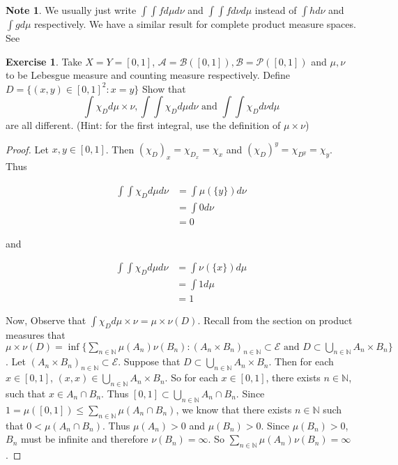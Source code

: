 \documentclass[12pt]{amsart}
\theoremstyle{definition}
\newtheorem{note}[definition]{Note}
\newtheorem{ex}[definition]{Exercise}
\newcommand{\N}{\mathbb{N}}
\newcommand{\MA}{\mathcal{A}}
\newcommand{\MB}{\mathcal{B}}
\newcommand{\MP}{\mathcal{P}}
\newcommand{\ME}{\mathcal{E}}
\begin{document}
	\begin{note}
		We usually just write $\int \int f d\mu d\nu$ and $\int \int f d\nu d\mu$ instead of $\int h d\nu$ and $\int g d\mu$ respectively. We have a similar result for complete product measure spaces. See 
	\end{note}
	
	\begin{ex}
		Take $X=Y= [0,1]$, $\MA = \MB([0,1]), \MB = \MP([0,1])$ and $\mu,\nu$ to be Lebesgue measure and counting measure respectively. Define $D = \{(x,y) \in [0,1]^2: x=y\}$ Show that $$\int \chi_D d\mu \times \nu, \int \int \chi_D d\mu d \nu \text{ and } \int \int \chi_D d\nu d\mu$$ are all different. (Hint: for the first integral, use the definition of $\mu \times \nu$)
	\end{ex}
	
	\begin{proof}
		Let $x,y \in [0,1]$. Then $(\chi_D)_x = \chi_{D_x} = \chi_{x}$ and $(\chi_D)^y = \chi_{D^y} = \chi_{y}$. Thus
		
		\begin{align*}
			\int \int \chi_D d\mu d \nu
			&= \int \mu(\{y\}) d\nu\\
			&= \int 0 d\nu\\
			&= 0
		\end{align*}
		
		and
		
		\begin{align*}
			\int \int \chi_D d\mu d \nu
			&= \int \nu(\{x\}) d\mu\\
			&= \int 1 d\mu\\
			&= 1
		\end{align*}
		
		Now, Observe that $\int \chi_D d\mu \times \nu = \mu \times \nu(D)$. Recall from the section on product measures that $\mu \times \nu(D) = \inf \{\sum_{n \in \N}\mu(A_n)\nu(B_n): (A_n \times B_n)_{n \in \N} \subset \ME \text{ and } D \subset \bigcup_{n \in \N} A_n \times B_n \}$. Let $(A_n \times B_n)_{n \in \N} \subset \ME$. Suppose that $D \subset \bigcup_{n \in \N}A_n \times B_n$. Then for each $x \in [0,1]$, $(x,x) \in  \bigcup_{n \in \N} A_n \times B_n$. So for each $x \in [0,1]$, there exists $n \in \N$, such that $x \in A_n \cap B_n$. Thus $[0,1] \subset \bigcup_{n \in \N} A_n \cap B_n.$ Since $1  = \mu([0,1]) \leq \sum_{n \in \N}\mu(A_n \cap B_n)$, we know that there exists $n \in \N$ such that $0 < \mu(A_n \cap B_n)$. Thus $\mu(A_n)> 0$ and $\mu(B_n) > 0$. Since $\mu(B_n) > 0$, $B_n$ must be infinite and therefore $\nu(B_n) = \infty$. So $\sum_{n \in \N} \mu(A_n)\nu(B_n) = \infty$.
		
	\end{proof}
	
\end{document}
